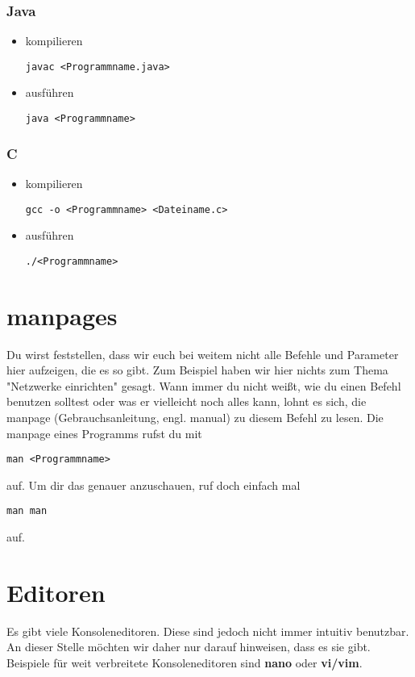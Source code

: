 \documentclass[a4paper,12pt]{article}
\begin{document}
\subsubsection{Java}
\begin{itemize}
\item kompilieren 
\begin{lstlisting}
javac <Programmname.java>
\end{lstlisting} 
\item ausführen
\begin{lstlisting}
java <Programmname>
\end{lstlisting} 
\end{itemize}

\subsubsection{C}
\begin{itemize}
\item kompilieren
\begin{lstlisting}
gcc -o <Programmname> <Dateiname.c>
\end{lstlisting} 
\item ausführen
\begin{lstlisting}
./<Programmname>
\end{lstlisting} 
\end{itemize}

\section{manpages}
Du wirst feststellen, dass wir euch bei weitem nicht alle Befehle und 
Parameter hier aufzeigen, die es so gibt. Zum Beispiel haben wir hier 
nichts zum Thema "Netzwerke einrichten" gesagt. Wann immer du nicht 
weißt, wie du einen Befehl benutzen solltest oder was er vielleicht 
noch alles kann, lohnt es sich, die manpage (Gebrauchsanleitung, engl. 
manual) zu diesem Befehl zu lesen. Die manpage eines Programms rufst du 
mit 
\begin{lstlisting}
man <Programmname>
\end{lstlisting} 
 auf. Um dir das genauer anzuschauen, ruf doch einfach mal 
\begin{lstlisting}
man man
\end{lstlisting} 
auf.

\section{Editoren}
Es gibt viele Konsoleneditoren. Diese sind jedoch nicht immer intuitiv 
benutzbar. An dieser Stelle möchten wir daher nur darauf hinweisen, dass 
es sie gibt. Beispiele für weit verbreitete Konsoleneditoren sind 
\textbf{nano} oder \textbf{vi/vim}.
\end{document}
